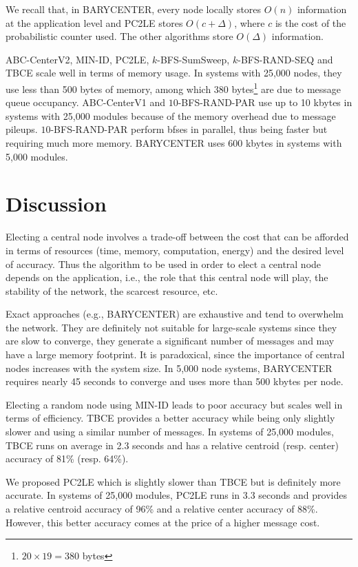We recall that, in BARYCENTER, every node locally stores $O(n)$ information at the application level and PC2LE stores $O(c + \Delta)$, where $c$ is the cost of the probabilistic counter used. The other algorithms store $O(\Delta)$ information.

ABC-CenterV2, MIN-ID, PC2LE, $k$-BFS-SumSweep, $k$-BFS-RAND-SEQ and TBCE scale well in terms of memory usage. In systems with 25,000 nodes, they use less than 500 bytes of memory, among which 380 bytes\footnote{$20\times19 = 380$ bytes} are due to message queue occupancy. ABC-CenterV1 and $10$-BFS-RAND-PAR use up to 10 kbytes in systems with 25,000 modules because of the memory overhead due to message pileups. $10$-BFS-RAND-PAR perform \gls{bfses} in parallel, thus being faster but requiring much more memory. BARYCENTER uses 600 kbytes in systems with 5,000 modules.

\section{Discussion}
Electing a central node involves a trade-off between the cost that can be afforded in terms of resources (time, memory, computation, energy) and the desired level of accuracy. Thus the algorithm to be used in order to elect a central node depends on the application, i.e., the role that this central node will play, the stability of the network, the scarcest resource, etc. 

Exact approaches (e.g., BARYCENTER) are exhaustive and tend to overwhelm the network. They are definitely not suitable for large-scale systems since they are slow to converge, they generate a significant number of messages and may have a large memory footprint. It is paradoxical, since the importance of central nodes increases with the system size. In 5,000 node systems, BARYCENTER requires nearly 45 seconds to converge and uses more than 500 kbytes per node.

Electing a random node using MIN-ID leads to poor accuracy but scales well in terms of efficiency. TBCE provides a better accuracy while being only slightly slower and using a similar number of messages. In systems of 25,000 modules, TBCE runs on average in 2.3 seconds and has a relative centroid (resp. center) accuracy of 81\% (resp. 64\%).

We proposed PC2LE which is slightly slower than TBCE but is definitely more accurate. In systems of 25,000 modules, PC2LE runs in 3.3 seconds and provides a relative centroid accuracy of 96\% and a relative center accuracy of 88\%. However, this better accuracy comes at the price of a higher message cost.

